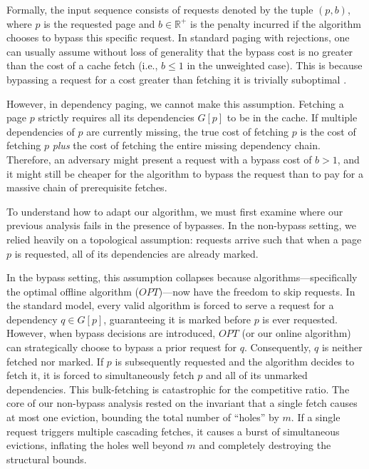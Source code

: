 \documentclass[a4paper]{article}
\begin{document}
Formally, the input sequence consists of requests denoted by the tuple $(p, b)$, where $p$ is the requested page and $b \in \mathbb{R}^+$ is the penalty incurred if the algorithm chooses to bypass this specific request. In standard paging with rejections, one can usually assume without loss of generality that the bypass cost is no greater than the cost of a cache fetch (i.e., $b \le 1$ in the unweighted case). This is because bypassing a request for a cost greater than fetching it is trivially suboptimal \cite{Epsteinetal2013}. 

However, in dependency paging, we cannot make this assumption. Fetching a page $p$ strictly requires all its dependencies $G[p]$ to be in the cache. If multiple dependencies of $p$ are currently missing, the true cost of fetching $p$ is the cost of fetching $p$ \textit{plus} the cost of fetching the entire missing dependency chain. Therefore, an adversary might present a request with a bypass cost of $b > 1$, and it might still be cheaper for the algorithm to bypass the request than to pay for a massive chain of prerequisite fetches. 

To understand how to adapt our algorithm, we must first examine where our previous analysis fails in the presence of bypasses. In the non-bypass setting, we relied heavily on a topological assumption: requests arrive such that when a page $p$ is requested, all of its dependencies are already marked. 

In the bypass setting, this assumption collapses because algorithms—specifically the optimal offline algorithm ($OPT$)—now have the freedom to skip requests. In the standard model, every valid algorithm is forced to serve a request for a dependency $q \in G[p]$, guaranteeing it is marked before $p$ is ever requested. However, when bypass decisions are introduced, $OPT$ (or our online algorithm) can strategically choose to bypass a prior request for $q$. Consequently, $q$ is neither fetched nor marked. If $p$ is subsequently requested and the algorithm decides to fetch it, it is forced to simultaneously fetch $p$ and all of its unmarked dependencies. This bulk-fetching is catastrophic for the competitive ratio. The core of our non-bypass analysis rested on the invariant that a single fetch causes at most one eviction, bounding the total number of ``holes'' by $m$. If a single request triggers multiple cascading fetches, it causes a burst of simultaneous evictions, inflating the holes well beyond $m$ and completely destroying the structural bounds.
\end{document}
